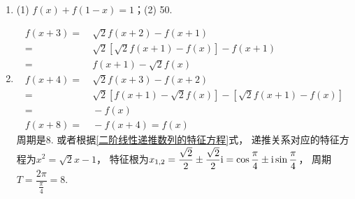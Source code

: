 \begin{enumerate}[label={\textbf{\thechapter.\arabic*}},leftmargin=
    \inteval{\myenumleftmargin}pt]
\item 
(1) $ f(x)+f(1-x)=1 $；\quad (2) 50.

\item 
\begin{align*}
    f(x+3) =&\ \sqrt{2}f(x+2)-f(x+1) \\
    =&\  \sqrt{2}[\sqrt{2}f(x+1)-f(x)]-f(x+1) \\
    =&\ f(x+1)-\sqrt{2}f(x) \\
    f(x+4) =&\ \sqrt{2}f(x+3)-f(x+2) \\
    =&\  \sqrt{2}[f(x+1)-\sqrt{2}f(x)]-[\sqrt{2}f(x+1)-f(x)] \\
    =&\ -f(x) \\
    f(x+8)=&\ -f(x+4)=f(x)
\end{align*} 
周期是8. 或者根据\eqref{二阶线性递推数列的特征方程}式，
递推关系对应的特征方程为$ x^2=\sqrt{2}x-1 $，
特征根为$ x_{1,2}=\dfrac{\sqrt{2}}{2}\pm \dfrac{\sqrt{2}}{2}\mathrm{i}=
\cos\dfrac{\pi}{4}\pm \mathrm{i}\sin\dfrac{\pi}{4} $，
周期$ T=\dfrac{2\pi}{\frac{\pi}{4}}=8 $. 


\end{enumerate}
